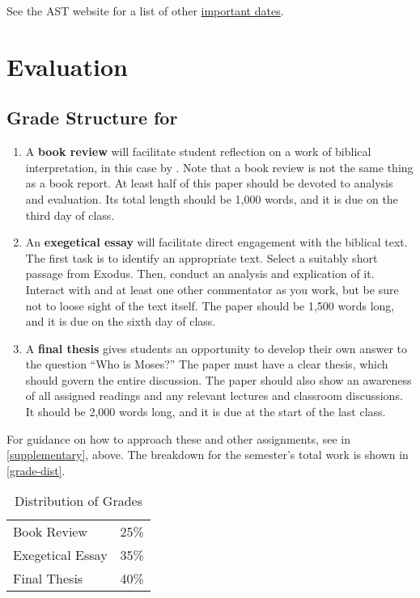 \documentclass[titlepage]{article}
\newcommand\policy{../policy}
\begin{document}
See the AST website for a list of other \href{http://www.astheology.ns.ca/students/academic-dates.html}{important dates}.

\section{Evaluation}
\label{evaluation}

\subsection{Grade Structure for \ccode}
\label{structure}

\begin{enumerate}

	\item A \textbf{book review} will facilitate student reflection on a
	work of biblical interpretation, in this case by \cite{vonrad}. Note
	that a book review is not the same thing as a book report. At least
	half of this paper should be devoted to analysis and evaluation. Its
	total length should be 1,000 words, and it is due on the third day
	of class.

	\item An \textbf{exegetical essay} will facilitate direct engagement
	with the biblical text. The first task is to identify an appropriate
	text. Select a suitably short passage from Exodus. Then, conduct an
	analysis and explication of it. Interact with \cite{childs} and at
	least one other commentator as you work, but be sure not to loose
	sight of the text itself. The paper should be 1,500 words long, and
	it is due on the sixth day of class.

	\item A \textbf{final thesis} gives students an opportunity to
	develop their own answer to the question “Who is Moses?” The paper
	must have a clear thesis, which should govern the entire discussion.
	The paper should also show an awareness of all assigned readings and
	any relevant lectures and classroom discussions. It should be 2,000
	words long, and it is due at the start of the last class.

\end{enumerate}

For guidance on how to approach these and other assignments, see
\cite{rlgs} in \autoref{supplementary}, above. The breakdown for the
semester's total work is shown in \autoref{grade-dist}.

\begin{table}[htbp]
  \centering
  {\lining
  \begin{tabular}{lr}
    \toprule
    Book Review      & 25\% \\
    Exegetical Essay & 35\% \\
    Final Thesis     & 40\% \\
    \bottomrule
  \end{tabular}}
  \caption{Distribution of Grades}
  \label{grade-dist}
\end{table}




\end{document}

